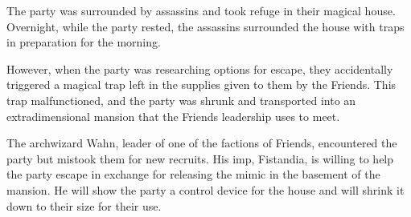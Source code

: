 The party was surrounded by assassins and took refuge in their magical house.
Overnight, while the party rested, the assassins surrounded the house with traps in preparation for the morning.

However, when the party was researching options for escape, they accidentally triggered a magical trap left in the supplies given to them by the Friends.
This trap malfunctioned, and the party was shrunk and transported into an extradimensional mansion that the Friends leadership uses to meet.

The archwizard Wahn, leader of one of the factions of Friends, encountered the party but mistook them for new recruits.
His imp, Fistandia, is willing to help the party escape in exchange for releasing the mimic in the basement of the mansion.
He will show the party a control device for the house and will shrink it down to their size for their use.

